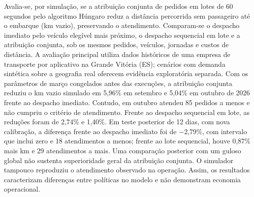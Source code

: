 \begin{resumo}
Avalia-se, por simulação, se a atribuição conjunta de pedidos em lotes de 60 segundos pelo algoritmo Húngaro reduz a distância percorrida sem passageiro até o embarque (km vazio), preservando o atendimento. Comparam-se o despacho imediato pelo veículo elegível mais próximo, o despacho sequencial em lote e a atribuição conjunta, sob os mesmos pedidos, veículos, jornadas e custos de distância. A avaliação principal utiliza dados históricos de uma empresa de transporte por aplicativo na Grande Vitória (ES); cenários com demanda sintética sobre a geografia real oferecem evidência exploratória separada. Com os parâmetros de março congelados antes das execuções, a atribuição conjunta reduziu o km vazio simulado em 5,96\% em setembro e 5,04\% em outubro de 2026 frente ao despacho imediato. Contudo, em outubro atendeu 85 pedidos a menos e não cumpriu o critério de atendimento. Frente ao despacho sequencial em lote, as reduções foram de 2,74\% e 1,40\%. Em teste posterior de 12 dias, com nova calibração, a diferença frente ao despacho imediato foi de −2,79\%, com intervalo que inclui zero e 18 atendimentos a menos; frente ao lote sequencial, houve 0,87\% mais km e 29 atendimentos a mais. Uma comparação posterior com um guloso global não sustenta superioridade geral da atribuição conjunta. O simulador tampouco reproduziu o atendimento observado na operação. Assim, os resultados caracterizam diferenças entre políticas no modelo e não demonstram economia operacional.
\end{resumo}

\begin{abstract}
Simulation is used to assess whether jointly assigning requests in 60-second batches with the Hungarian algorithm reduces the distance driven without a passenger to pickup (empty kilometers) while preserving service. Immediate dispatch to the nearest eligible vehicle, sequential batch dispatch, and joint assignment are compared using the same requests, vehicles, shifts, and distance costs. The main evaluation uses historical data from a ride-hailing company in Greater Vitória, Brazil; synthetic demand over the real geography provides separate exploratory evidence. With March parameters frozen before execution, joint assignment reduced simulated empty kilometers by 5.96\% in September and 5.04\% in October 2026 relative to immediate dispatch. However, it served 85 fewer requests in October and failed the service criterion. Relative to sequential batch dispatch, reductions were 2.74\% and 1.40\%. In a later 12-day test with new calibration, the difference relative to immediate dispatch was −2.79\%, with an interval including zero and 18 fewer requests served; relative to sequential batch dispatch, joint assignment incurred 0.87\% more empty kilometers while serving 29 more requests. A later comparison with a global greedy rule does not establish general superiority of joint assignment. The simulator also failed to reproduce service observed in the operation. The results therefore describe differences among policies within the model and do not demonstrate operational savings.
\end{abstract}
